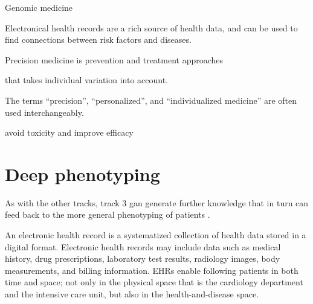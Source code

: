 Genomic medicine

Electronical health records are a rich source of health data,
and can be used to find connections between risk factors and diseases.

Precision medicine is prevention and treatment approaches

that takes individual variation into account.


The terms
\enquote{precision},
\enquote{personalized},
and \enquote{individualized medicine}
are often used interchangeably.

avoid toxicity and improve efficacy

\section{Deep phenotyping} \label{deep-pheno}



As with the other tracks, track 3 gan generate further knowledge 
that in turn can feed back to the more general phenotyping of patients
\autocite{konigWhat2017}. 

An electronic health record
is a systematized collection of health data 
stored in a digital format.
Electronic health records may include data such as
medical history, drug prescriptions, laboratory test results,
radiology images, body measurements, and billing information.
EHRs enable following patients in both time and space;
not only in the physical space that is the cardiology department
and the intensive care unit, but also in the health-and-disease space.



